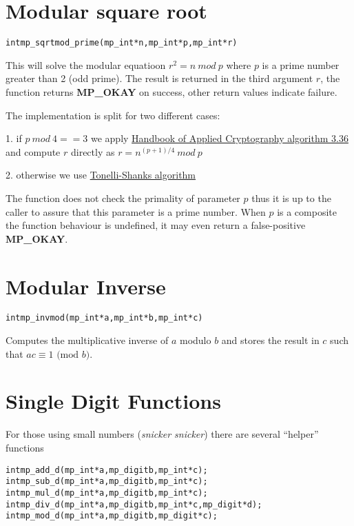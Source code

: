 \documentclass[synpaper]{book}
\def\mod{{\mathit\ mod\ }}
\begin{document}
\section{Modular square root}
\begin{alltt}
int mp_sqrtmod_prime(mp_int *n, mp_int *p, mp_int *r)
\end{alltt}

This will solve the modular equatioon $r^2 = n \mod p$ where $p$ is a prime number greater than 2 (odd prime).
The result is returned in the third argument $r$, the function returns \textbf{MP\_OKAY} on success,
other return values indicate failure.

The implementation is split for two different cases:

1. if $p \mod 4 == 3$ we apply \href{http://cacr.uwaterloo.ca/hac/}{Handbook of Applied Cryptography algorithm 3.36} and compute $r$ directly as
$r = n^{(p+1)/4} \mod p$

2. otherwise we use \href{https://en.wikipedia.org/wiki/Tonelli-Shanks_algorithm}{Tonelli-Shanks algorithm}

The function does not check the primality of parameter $p$ thus it is up to the caller to assure that this parameter
is a prime number. When $p$ is a composite the function behaviour is undefined, it may even return a false-positive
\textbf{MP\_OKAY}.

\section{Modular Inverse}
\begin{alltt}
int mp_invmod (mp_int * a, mp_int * b, mp_int * c)
\end{alltt}
Computes the multiplicative inverse of $a$ modulo $b$ and stores the result in $c$ such that $ac \equiv 1 \mbox{ (mod }b\mbox{)}$.

\section{Single Digit Functions}

For those using small numbers (\textit{snicker snicker}) there are several ``helper'' functions

    
\begin{alltt}
int mp_add_d(mp_int *a, mp_digit b, mp_int *c);
int mp_sub_d(mp_int *a, mp_digit b, mp_int *c);
int mp_mul_d(mp_int *a, mp_digit b, mp_int *c);
int mp_div_d(mp_int *a, mp_digit b, mp_int *c, mp_digit *d);
int mp_mod_d(mp_int *a, mp_digit b, mp_digit *c);
\end{alltt}
\end{document}
